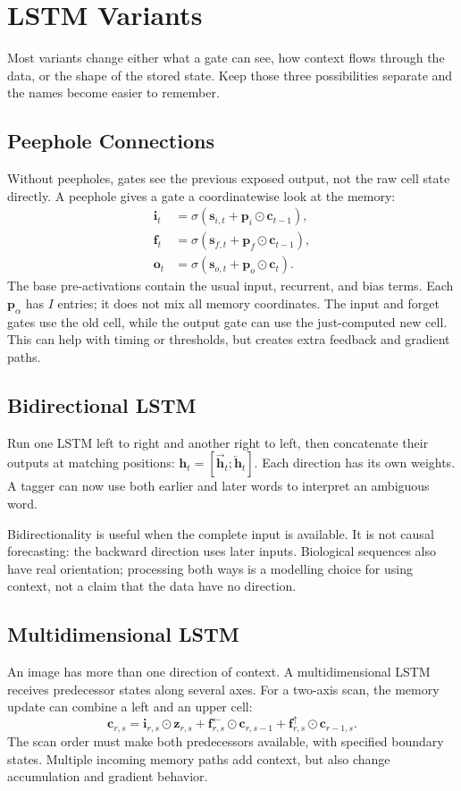 \documentclass[11pt, oneside]{book}
\let\originalsection\section
\renewcommand{\section}{\Needspace{7\baselineskip}\originalsection}
\let\originalsubsection\subsection
\renewcommand{\subsection}{\Needspace{6\baselineskip}\originalsubsection}
\begin{document}
\section{LSTM Variants}\label{sec:source-3-6}
Most variants change either what a gate can see, how context flows through the data, or the shape of the stored state. Keep those three possibilities separate and the names become easier to remember.

\subsection{Peephole Connections}\label{sec:source-3-6-1}
Without peepholes, gates see the previous exposed output, not the raw cell state directly. A peephole gives a gate a coordinatewise look at the memory:
\begin{align*}
 \mathbf{i}_t&=\sigma(\mathbf{s}_{i,t}+\mathbf{p}_i\odot\mathbf{c}_{t-1}),\\
 \mathbf{f}_t&=\sigma(\mathbf{s}_{f,t}+\mathbf{p}_f\odot\mathbf{c}_{t-1}),\\
 \mathbf{o}_t&=\sigma(\mathbf{s}_{o,t}+\mathbf{p}_o\odot\mathbf{c}_{t}).
\end{align*}
The base pre-activations contain the usual input, recurrent, and bias terms. Each $\mathbf{p}_\alpha$ has $I$ entries; it does not mix all memory coordinates. The input and forget gates use the old cell, while the output gate can use the just-computed new cell. This can help with timing or thresholds, but creates extra feedback and gradient paths.

\subsection{Bidirectional LSTM}\label{sec:source-3-6-2}
Run one LSTM left to right and another right to left, then concatenate their outputs at matching positions: $\mathbf{h}_t=[\overrightarrow{\mathbf{h}}_t;\overleftarrow{\mathbf{h}}_t]$. Each direction has its own weights. A tagger can now use both earlier and later words to interpret an ambiguous word.

Bidirectionality is useful when the complete input is available. It is not causal forecasting: the backward direction uses later inputs. Biological sequences also have real orientation; processing both ways is a modelling choice for using context, not a claim that the data have no direction.

\subsection{Multidimensional LSTM}\label{sec:source-3-6-3}
An image has more than one direction of context. A multidimensional LSTM receives predecessor states along several axes. For a two-axis scan, the memory update can combine a left and an upper cell:
\[
 \mathbf{c}_{r,s}=\mathbf{i}_{r,s}\odot\mathbf{z}_{r,s}
    +\mathbf{f}^{\leftarrow}_{r,s}\odot\mathbf{c}_{r,s-1}
    +\mathbf{f}^{\uparrow}_{r,s}\odot\mathbf{c}_{r-1,s}.
\]
The scan order must make both predecessors available, with specified boundary states. Multiple incoming memory paths add context, but also change accumulation and gradient behavior.
\end{document}
